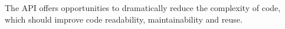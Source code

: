 The  API offers opportunities to dramatically reduce the complexity 
of code, which should improve code readability, maintainability and reuse.



\address{Dirk Eddelbuettel\\
  Debian Project\\
  Chicago, IL\\
  USA}\\

\address{Romain Fran\c{c}ois\\
  Professional R Enthusiast\\
  1 rue du Puits du Temple, 34 000 Montpellier\\
  FRANCE}\\

